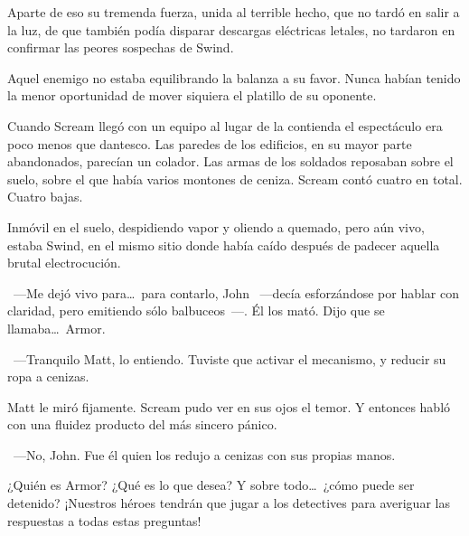 Aparte de eso su tremenda fuerza, unida al terrible hecho, que no tardó en salir a la luz, de que también podía disparar descargas eléctricas letales, no tardaron en confirmar las peores sospechas de Swind.

Aquel enemigo no estaba equilibrando la balanza a su favor. Nunca habían tenido la menor oportunidad de mover siquiera el platillo de su oponente.

\bigskip\noindent
Cuando Scream llegó con un equipo al lugar de la contienda el espectáculo era poco menos que dantesco. Las paredes de los edificios, en su mayor parte abandonados, parecían un colador. Las armas de los soldados reposaban sobre el suelo, sobre el que había varios montones de ceniza. Scream contó cuatro en total. Cuatro bajas.

Inmóvil en el suelo, despidiendo vapor y oliendo a quemado, pero aún vivo, estaba Swind, en el mismo sitio donde había caído después de padecer aquella brutal electrocución.

~---Me dejó vivo para\dots\ para contarlo, John ~---decía esforzándose por hablar con claridad, pero emitiendo sólo balbuceos~---. Él los mató. Dijo que se llamaba\dots\ Armor.

~---Tranquilo Matt, lo entiendo. Tuviste que activar el mecanismo, y reducir su ropa a cenizas.

Matt le miró fijamente. Scream pudo ver en sus ojos el temor. Y entonces habló con una fluidez producto del más sincero pánico.

~---No, John. Fue él quien los redujo a cenizas con sus propias manos.

\begin{next}
    ¿Quién es Armor? ¿Qué es lo que desea? Y sobre todo\dots\ ¿cómo puede ser detenido? ¡Nuestros héroes tendrán que jugar a los detectives para averiguar las respuestas a todas estas preguntas!
\end{next}

\endinput
